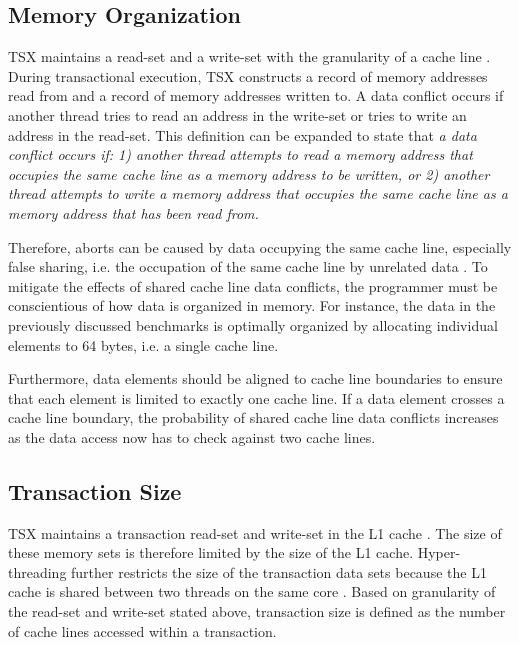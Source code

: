 \documentclass[a4paper]{article}
\begin{document}
\subsection{\textbf{Memory Organization}}

\indent 
TSX maintains a read-set and a write-set with the granularity of a cache line
\cite{intel_prog_ref}.  During transactional execution, TSX constructs a
record of memory addresses read from and a record of memory addresses written
to.  A data conflict occurs if another thread tries to read an address in the
write-set or tries to write an address in the read-set.  This definition can be
expanded to state that \textit{a data conflict occurs if: 1) another thread attempts to
read a memory address that occupies the same cache line as a memory address to
be written, or 2) another thread attempts to write a memory address that
occupies the same cache line as a memory address that has been read from.}
\par

\indent 
Therefore, aborts can be caused by data occupying the same cache line,
especially false sharing, i.e. the occupation of the same cache line by
unrelated data \cite{intel_opt_man}.  To mitigate the effects of shared
cache line data conflicts, the programmer must be conscientious of how data is
organized in memory.  For instance, the data in the previously discussed
benchmarks is optimally organized by allocating individual elements to 64 bytes,
i.e. a single cache line.
\par

\indent 
Furthermore, data elements should be aligned to cache line boundaries
to ensure that each element is limited to exactly one cache line.  If a data
element crosses a cache line boundary, the probability of shared cache line data
conflicts increases as the data access now has to check against two cache lines.  
\par

\subsection{\textbf{Transaction Size}}

\indent
TSX maintains a transaction read-set and write-set in the L1 cache
\cite{intel_opt_man}.  The size of these memory sets is therefore limited by
the size of the L1 cache.  Hyper-threading further restricts the size of the
transaction data sets because the L1 cache is shared between two threads on the
same core \cite{intel_opt_man}.  Based on granularity of the read-set and write-set stated
above, transaction size is defined as the number of cache lines accessed within
a transaction.  
\par 
\end{document}
